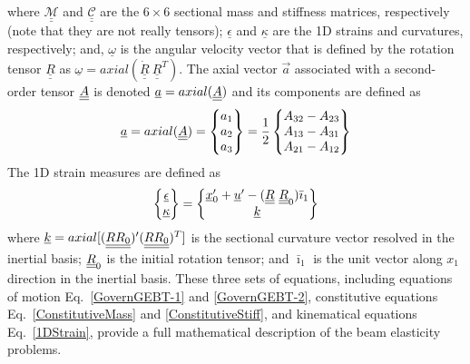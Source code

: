 where $\underline{\underline{\mathcal{M}}}$ and
$\underline{\underline{\mathcal{C}}}$ are the $6 \times 6$ sectional mass
and stiffness matrices, respectively (note that they are not really tensors);
$\underline{\epsilon}$ and $\underline{\kappa}$ are the 1D strains and
curvatures, respectively; and, $\underline{\omega}$ is the angular velocity
vector that is defined by the rotation tensor $\underline{\underline{R}}$ as
$\underline{\omega} =
axial(\dot{\underline{\underline{R}}}~\underline{\underline{R}}^T)$. 
The axial vector $\vec{a}$ associated with a second-order tensor $\underline{\underline{A}}$ is denoted $\underline{a}=axial(\underline{\underline{A}})$ and its components are defined as
\begin{equation}
    \label{axial}
    \underline{a} = axial(\underline{\underline{A}})=\begin{Bmatrix}
    a_1 \\
    a_2 \\
    a_3
    \end{Bmatrix}
    =\frac{1}{2}
    \begin{Bmatrix}
    A_{32}-A_{23} \\
    A_{13}-A_{31} \\
    A_{21}-A_{12}
    \end{Bmatrix}
\end{equation}
The 1D strain measures are defined as
\begin{equation}
    \label{1DStrain}
    \begin{Bmatrix}
        \underline{\epsilon} \\
        \underline{\kappa}
    \end{Bmatrix}
    =
    \begin{Bmatrix}
        \underline{x}^\prime_0 + \underline{u}^\prime - (\underline{\underline{R}} ~\underline{\underline{R}}_0) \bar{\imath}_1 \\
        \underline{k}
    \end{Bmatrix}
\end{equation}
where $\underline{k} = axial [(\underline{\underline{R R_0}})^\prime (\underline{\underline{R R_0}})^T]$ is the sectional
curvature vector resolved in the inertial basis; $\underline{\underline{R}}_0$ is the initial rotation tensor; and $\bar{\imath}_1$ is the unit vector along $x_1$ direction in the inertial basis. 
These three sets of equations, including equations of motion Eq.~\eqref{GovernGEBT-1} and \eqref{GovernGEBT-2}, constitutive equations
Eq.~\eqref{ConstitutiveMass} and \eqref{ConstitutiveStiff}, and kinematical
equations Eq.~\eqref{1DStrain}, provide a full mathematical description of the beam elasticity problems. 

